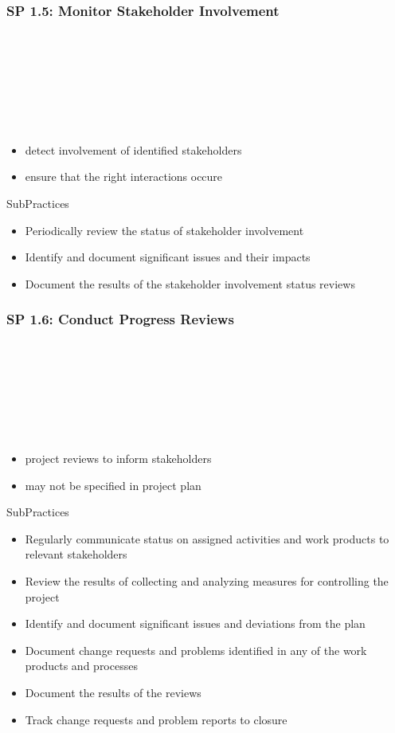\documentclass[accentcolor=tud1b]{tudbeamer}
\newcommand{\strong}[1]{\textaccentcolor{\textsf{\textbf{#1}}}}
\newenvironment*{tframe}[1][]{%
	\begin{frame}
	\ifnum\Level=2
		\frametitle{\insertsectionhead\\\strong{#1}}
	\fi\ifnum\Level=3
		\frametitle{\insertsectionhead\\\strong{\insertsubsectionhead} \textnormal{#1}}
	\fi\ifnum\Level=4
		\frametitle{\insertsubsectionhead\\\strong{\insertsubsubsectionhead} #1}
	\fi
}{%
	\end{frame}
}
\begin{document}
\subsubsection{SP 1.5: Monitor Stakeholder Involvement}
\begin{tframe}
	\begin{itemize}
		\item detect involvement of identified stakeholders 
		\item ensure that the right interactions occure
	\end{itemize}
	\begin{block}{SubPractices}
		\begin{itemize}
		  \item Periodically review the status of stakeholder involvement
		  \item Identify and document significant issues and their impacts
		  \item Document the results of the stakeholder involvement status reviews
		\end{itemize}
	\end{block}
\end{tframe}

\subsubsection{SP 1.6: Conduct Progress Reviews}
\begin{tframe}
	\begin{itemize}
		\item project reviews to inform stakeholders
		\item may not be specified in project plan
	\end{itemize}
	\begin{block}{SubPractices}
		\begin{itemize}
		  \item Regularly communicate status on assigned activities and work products to relevant stakeholders
		  \item Review the results of collecting and analyzing measures for controlling the project
		  \item Identify and document significant issues and deviations from the plan
		  \item Document change requests and problems identified in any of the work products and processes
		  \item Document the results of the reviews
		  \item Track change requests and problem reports to closure
		\end{itemize}
	\end{block}
\end{tframe}
\end{document}
